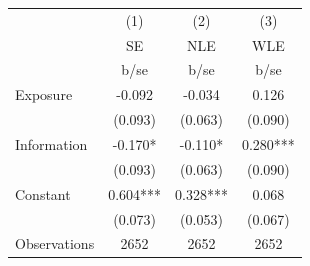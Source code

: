{
\def\sym#1{\ifmmode^{#1}\else\(^{#1}\)\fi}
\begin{tabular}{l*{3}{c}}
\hline\hline
                    &\multicolumn{1}{c}{(1)}&\multicolumn{1}{c}{(2)}&\multicolumn{1}{c}{(3)}\\
                    &\multicolumn{1}{c}{SE}&\multicolumn{1}{c}{NLE}&\multicolumn{1}{c}{WLE}\\
                    &        b/se   &        b/se   &        b/se   \\
\hline
Exposure            &      -0.092   &      -0.034   &       0.126   \\
                    &     (0.093)   &     (0.063)   &     (0.090)   \\
Information         &      -0.170*  &      -0.110*  &       0.280***\\
                    &     (0.093)   &     (0.063)   &     (0.090)   \\
Constant            &       0.604***&       0.328***&       0.068   \\
                    &     (0.073)   &     (0.053)   &     (0.067)   \\
\hline
Observations        &        2652   &        2652   &        2652   \\
\hline\hline
\end{tabular}
}
